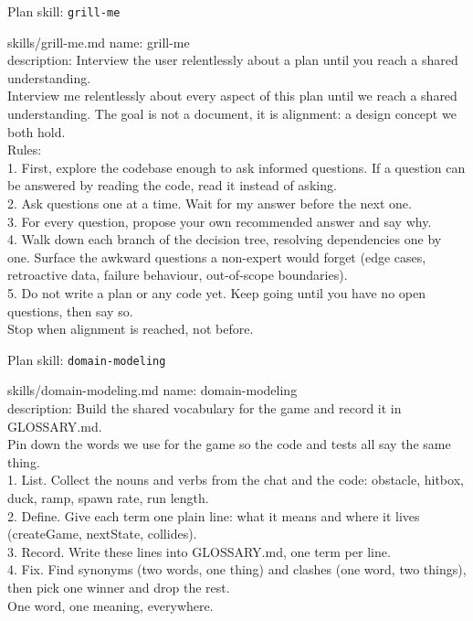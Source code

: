 \begin{frame}{Plan skill: \texttt{grill-me}}
  \begin{tdcodet}{skills/grill-me.md}
    \tiny
    name: grill-me\\
    description: Interview the user relentlessly about a plan until you reach a shared understanding.\\[3pt]
    Interview me relentlessly about every aspect of this plan until we reach a shared understanding. The goal is not a document, it is alignment: a design concept we both hold.\\[3pt]
    Rules:\\[2pt]
    1. First, explore the codebase enough to ask informed questions. If a question can be answered by reading the code, read it instead of asking.\\
    2. Ask questions one at a time. Wait for my answer before the next one.\\
    3. For every question, propose your own recommended answer and say why.\\
    4. Walk down each branch of the decision tree, resolving dependencies one by one. Surface the awkward questions a non-expert would forget (edge cases, retroactive data, failure behaviour, out-of-scope boundaries).\\
    5. Do not write a plan or any code yet. Keep going until you have no open questions, then say so.\\[3pt]
    Stop when alignment is reached, not before.
  \end{tdcodet}
\end{frame}

\begin{frame}{Plan skill: \texttt{domain-modeling}}
  \begin{tdcodet}{skills/domain-modeling.md}
    name: domain-modeling\\
    description: Build the shared vocabulary for the game and record it in GLOSSARY.md.\\[3pt]
    Pin down the words we use for the game so the code and tests all say the same thing.\\[3pt]
    1. List. Collect the nouns and verbs from the chat and the code: obstacle, hitbox, duck, ramp, spawn rate, run length.\\
    2. Define. Give each term one plain line: what it means and where it lives (createGame, nextState, collides).\\
    3. Record. Write these lines into GLOSSARY.md, one term per line.\\
    4. Fix. Find synonyms (two words, one thing) and clashes (one word, two things), then pick one winner and drop the rest.\\[3pt]
    One word, one meaning, everywhere.
  \end{tdcodet}
\end{frame}

